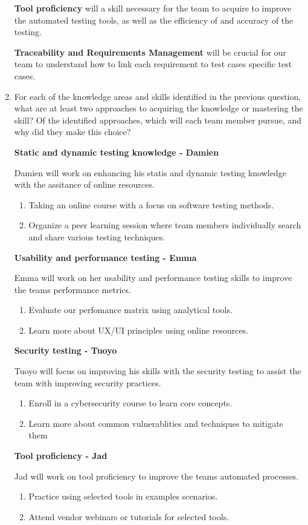 \documentclass[12pt, titlepage]{article}
\begin{document}
\begin{enumerate}
		\textbf{Tool proficiency} will a skill necessary for the team to acquire to
		improve the automated testing tools, as well as the efficiency of and accuracy
		of the testing.

		\textbf{Traceability and Requirements Management} will be crucial for our team
		to understand how to link each requirement to test cases specific test cases.
		
	\item For each of the knowledge areas and skills identified in the previous
	question, what are at least two approaches to acquiring the knowledge or
	mastering the skill?  Of the identified approaches, which will each team
	member pursue, and why did they make this choice?
	
	\textbf{Static and dynamic testing knowledge - Damien} 

	Damien will work on enhancing his statis and dynamic testing knowledge with the
	assitance of online resources.
	\begin{enumerate}
		\item Taking an online course with a focus on software testing methods.
		\item Organize a peer learning session where team members individually
		search and share various testing techniques.
	\end{enumerate}
	\textbf{Usability and performance testing - Emma} 

	Emma will work on her usability and performance testing skills to improve
	the teams performance metrics.
	\begin{enumerate}
		\item Evaluate our perfomance matrix using analytical tools.
		\item Learn more about UX/UI principles using online resources.
	\end{enumerate}
	\textbf{Security testing - Tuoyo}

	Tuoyo will focus on improving his skills with the security testing to assist
	the team with improving security practices.
	\begin{enumerate}
		\item Enroll in a cybersecurity course to learn core concepts.
		\item Learn more about common vulnerablities and techniques to mitigate them
	\end{enumerate}

	\textbf{Tool proficiency - Jad} 

	Jad will work on tool proficiency to improve the teams automated processes.
	\begin{enumerate}
		\item Practice using selected tools in examples scenarios.
		\item Attend vendor webinars or tutorials for selected tools.
	\end{enumerate}


\end{enumerate}
\end{document}
